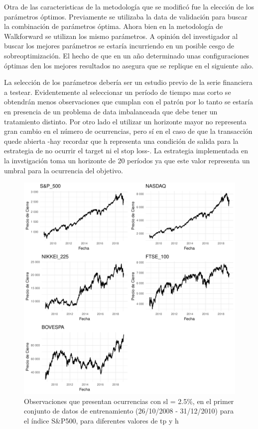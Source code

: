 \documentclass[a4paper,12pt]{Latex/Classes/PhDthesisPSnPDF}
\begin{document}
Otra de las caracteristicas de la metodología que se modificó fue la elección de los parámetros óptimos. Previamente se utilizaba la data de validación para buscar la combinación de parámetros óptima. Ahora bien en la metodología de Walkforward se utilizan los mismo parámetros. A opinión del investigador al buscar los mejores parámetros se estaría incurriendo en un posible cesgo de sobreoptimización. El hecho de que en un año determinado unas configuraciones óptimas den los mejores resultados no asegura que se replique en el siguiente año.

La selección de los parámetros debería ser un estudio previo de la serie financiera a testear. Evidentemente al seleccionar un período de tiempo mas corto se obtendrán menos observaciones que cumplan con el patrón por lo tanto se estaría en presencia de un problema de data imbalanceada que debe tener un tratamiento distinto. Por otro lado el utilizar un horizonte mayor no representa gran cambio en el número de ocurrencias, pero sí en el caso de que la transacción quede abierta -hay recordar que h representa una condición de salida para la estrategia de no ocurrir el target ni el stop loss-. La estrategia implementada en la invstigación toma un horizonte de 20 períodos ya que este valor representa un umbral para la ocurrencia del objetivo.


\begin{figure}[H]
\centering
\includegraphics{main-002}
\caption{Observaciones que presentan ocurrencias con sl = 2.5\%, en el primer conjunto de datos de entrenamiento (26/10/2008 - 31/12/2010) para el índice S\&P500, para diferentes valores de tp y h}
\end{figure}
\end{document}
